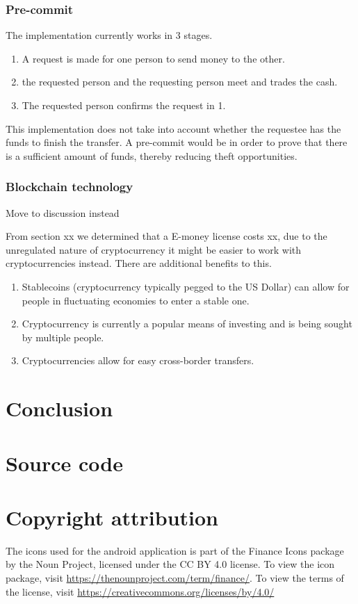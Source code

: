 \documentclass[11pt, a4paper]{article}
\begin{document}
\subsubsection{Pre-commit} %
\label{sub:pre_commit}
The implementation currently works in 3 stages.
\begin{enumerate}
    \item A request is made for one person to send money to the other.
    \item the requested person and the requesting person meet and trades the cash.
    \item The requested person confirms the request in 1.
\end{enumerate}
This implementation does not take into account whether the requestee has the funds to finish the transfer. A pre-commit would be in order to prove that there is a sufficient amount of funds, thereby reducing theft opportunities.
\subsubsection{Blockchain technology} %

\label{sub:blockchain_technology}
{\color{red} Move to discussion instead}

From {\color{red} section xx} we determined that a E-money license costs {\color{red} xx}, due to the unregulated nature of cryptocurrency it might be easier to work with cryptocurrencies instead. There are additional benefits to this.
\begin{enumerate}
    \item Stablecoins (cryptocurrency typically pegged to the US Dollar) can allow for people in fluctuating economies to enter a stable one.
    \item Cryptocurrency is currently a popular means of investing and is being sought by multiple people.
    \item Cryptocurrencies allow for easy cross-border transfers.
\end{enumerate}
\section{Conclusion}

\begingroup
\let\cleardoublepage\clearpage


\endgroup

\begin{appendices}
\section{Source code}
\section{Copyright attribution}
The icons used for the android application is part of the Finance Icons package by the Noun Project, licensed under the CC BY 4.0 license. To view the icon package, visit \url{https://thenounproject.com/term/finance/}. To view the terms of the license, visit \url{https://creativecommons.org/licenses/by/4.0/}
\end{appendices}
\end{document}
